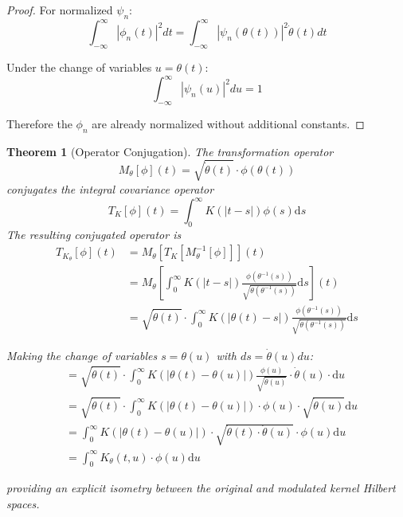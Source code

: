 \documentclass{article}
\newtheorem{theorem}{Theorem}
\newcommand{\dd}{\mathrm{d}}
\newcommand{\dottheta}{\dot{\theta}}
\begin{document}
\begin{proof}
For normalized $\psi_n$:
\begin{equation}
\int_{-\infty}^{\infty} |\phi_n(t)|^2 dt = \int_{-\infty}^{\infty} |\psi_n(\theta(t))|^2 \dottheta(t) dt
\end{equation}

Under the change of variables $u=\theta(t)$:
\begin{equation}
\int_{-\infty}^{\infty} |\psi_n(u)|^2 du = 1
\end{equation}

Therefore the $\phi_n$ are already normalized without additional constants.
\end{proof}

\begin{theorem}[Operator Conjugation]
The transformation operator
\begin{equation}
M_\theta[\phi](t) = \sqrt{\dottheta(t)} \cdot \phi(\theta(t))
\end{equation}
conjugates the integral covariance operator
\begin{equation}
T_K[\phi](t) = \int_0^\infty K(|t-s|) \phi(s) \dd s
\end{equation}
The resulting conjugated operator is
\begin{align}
T_{K_\theta}[\phi](t) &= M_\theta[T_K[M_\theta^{-1}[\phi]]](t)\\
&= M_\theta[\int_0^\infty K(|t-s|)\frac{\phi(\theta^{-1}(s))}{\sqrt{\dottheta(\theta^{-1}(s))}} \dd s](t)\\
&= \sqrt{\dottheta(t)} \cdot \int_0^\infty K(|\theta(t)-s|)\frac{\phi(\theta^{-1}(s))}{\sqrt{\dottheta(\theta^{-1}(s))}} \dd s
\end{align}

Making the change of variables $s = \theta(u)$ with $ds = \dottheta(u)du$:
\begin{align}
&= \sqrt{\dottheta(t)} \cdot \int_0^\infty K(|\theta(t)-\theta(u)|)\frac{\phi(u)}{\sqrt{\dottheta(u)}} \cdot \dottheta(u) \cdot \dd u\\
&= \sqrt{\dottheta(t)} \cdot \int_0^\infty K(|\theta(t)-\theta(u)|) \cdot \phi(u) \cdot \sqrt{\dottheta(u)} \dd u\\
&= \int_0^\infty K(|\theta(t)-\theta(u)|) \cdot \sqrt{\dottheta(t) \cdot \dottheta(u)} \cdot \phi(u) \dd u\\
&= \int_0^\infty K_\theta(t,u) \cdot \phi(u) \dd u
\end{align}

providing an explicit isometry between the original and modulated kernel Hilbert spaces.
\end{theorem}
\end{document}
